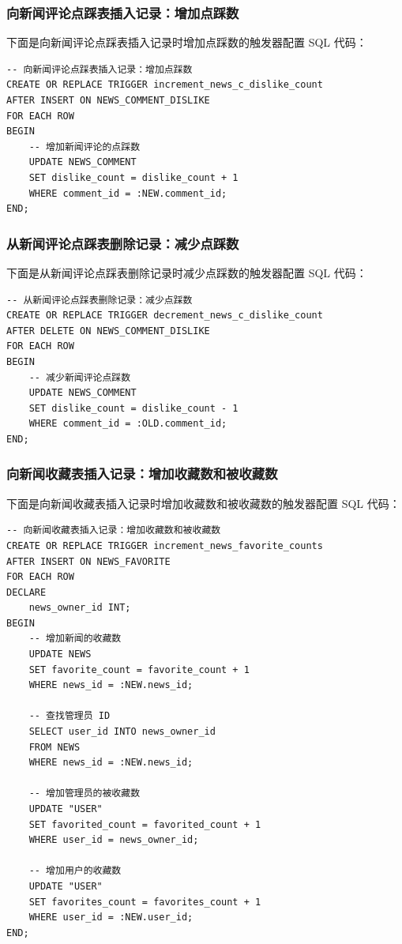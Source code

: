 \subsubsection{向新闻评论点踩表插入记录：增加点踩数}

下面是向新闻评论点踩表插入记录时增加点踩数的触发器配置 SQL 代码：

\begin{verbatim}
-- 向新闻评论点踩表插入记录：增加点踩数
CREATE OR REPLACE TRIGGER increment_news_c_dislike_count
AFTER INSERT ON NEWS_COMMENT_DISLIKE
FOR EACH ROW
BEGIN
    -- 增加新闻评论的点踩数
    UPDATE NEWS_COMMENT
    SET dislike_count = dislike_count + 1
    WHERE comment_id = :NEW.comment_id;
END;
\end{verbatim}

\subsubsection{从新闻评论点踩表删除记录：减少点踩数}

下面是从新闻评论点踩表删除记录时减少点踩数的触发器配置 SQL 代码：

\begin{verbatim}
-- 从新闻评论点踩表删除记录：减少点踩数
CREATE OR REPLACE TRIGGER decrement_news_c_dislike_count
AFTER DELETE ON NEWS_COMMENT_DISLIKE
FOR EACH ROW
BEGIN
    -- 减少新闻评论点踩数
    UPDATE NEWS_COMMENT
    SET dislike_count = dislike_count - 1
    WHERE comment_id = :OLD.comment_id;
END;
\end{verbatim}

\subsubsection{向新闻收藏表插入记录：增加收藏数和被收藏数}

下面是向新闻收藏表插入记录时增加收藏数和被收藏数的触发器配置 SQL 代码：

\begin{verbatim}
-- 向新闻收藏表插入记录：增加收藏数和被收藏数
CREATE OR REPLACE TRIGGER increment_news_favorite_counts
AFTER INSERT ON NEWS_FAVORITE
FOR EACH ROW
DECLARE
    news_owner_id INT;
BEGIN
    -- 增加新闻的收藏数
    UPDATE NEWS
    SET favorite_count = favorite_count + 1
    WHERE news_id = :NEW.news_id;

    -- 查找管理员 ID
    SELECT user_id INTO news_owner_id
    FROM NEWS
    WHERE news_id = :NEW.news_id;

    -- 增加管理员的被收藏数
    UPDATE "USER"
    SET favorited_count = favorited_count + 1
    WHERE user_id = news_owner_id;

    -- 增加用户的收藏数
    UPDATE "USER"
    SET favorites_count = favorites_count + 1
    WHERE user_id = :NEW.user_id;
END;
\end{verbatim}

